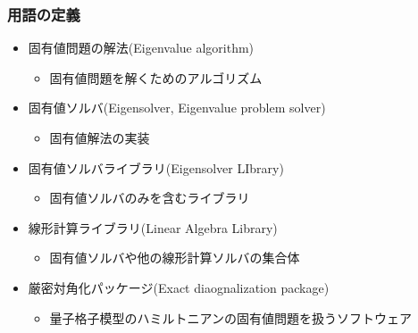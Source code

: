 \begin{frame}
  \frametitle{用語の定義}
  \begin{itemize}
  \item 固有値問題の解法(Eigenvalue algorithm)
    \begin{itemize}
      \item 固有値問題を解くためのアルゴリズム
    \end{itemize}
  \item 固有値ソルバ(Eigensolver, Eigenvalue problem solver)
    \begin{itemize}
      \item 固有値解法の実装
    \end{itemize}
  \item 固有値ソルバライブラリ(Eigensolver LIbrary)
    \begin{itemize}
      \item 固有値ソルバのみを含むライブラリ
    \end{itemize}
  \item 線形計算ライブラリ(Linear Algebra Library)
    \begin{itemize}
      \item 固有値ソルバや他の線形計算ソルバの集合体
    \end{itemize}
  \item 厳密対角化パッケージ(Exact diaognalization package)
    \begin{itemize}
      \item 量子格子模型のハミルトニアンの固有値問題を扱うソフトウェア
    \end{itemize}
  \end{itemize}
\end{frame}

